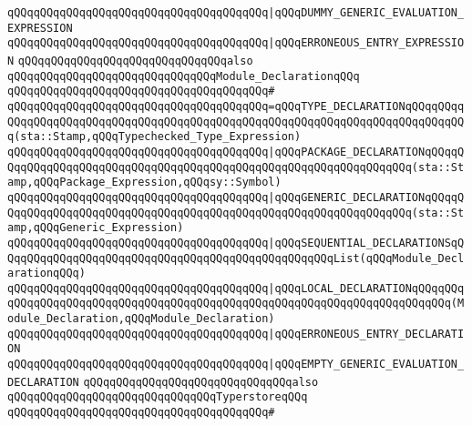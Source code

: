 \verb|qQQqqQQqqQQqqQQqqQQqqQQqqQQqqQQqqQQqqQQq|\verb#|qQQqDUMMY_GENERIC_EVALUATION_EXPRESSION#\newline
\verb|qQQqqQQqqQQqqQQqqQQqqQQqqQQqqQQqqQQqqQQq|\verb#|qQQqERRONEOUS_ENTRY_EXPRESSION#\newline
\newline
\newline
\newline
\verb|qQQqqQQqqQQqqQQqqQQqqQQqqQQqqQQqalso|\newline
\verb|qQQqqQQqqQQqqQQqqQQqqQQqqQQqqQQqModule_DeclarationqQQq|\newline
\verb|qQQqqQQqqQQqqQQqqQQqqQQqqQQqqQQqqQQqqQQq#|\newline
\verb|qQQqqQQqqQQqqQQqqQQqqQQqqQQqqQQqqQQqqQQq=qQQqTYPE_DECLARATIONqQQqqQQqqQQqqQQqqQQqqQQqqQQqqQQqqQQqqQQqqQQqqQQqqQQqqQQqqQQqqQQqqQQqqQQqqQQqqQQq(sta::Stamp,qQQqTypechecked_Type_Expression)|\newline
\verb|qQQqqQQqqQQqqQQqqQQqqQQqqQQqqQQqqQQqqQQq|\verb#|qQQqPACKAGE_DECLARATIONqQQqqQQqqQQqqQQqqQQqqQQqqQQqqQQqqQQqqQQqqQQqqQQqqQQqqQQqqQQqqQQqqQQq(sta::Stamp,qQQqPackage_Expression,qQQqsy::Symbol)#\newline
\verb|qQQqqQQqqQQqqQQqqQQqqQQqqQQqqQQqqQQqqQQq|\verb#|qQQqGENERIC_DECLARATIONqQQqqQQqqQQqqQQqqQQqqQQqqQQqqQQqqQQqqQQqqQQqqQQqqQQqqQQqqQQqqQQqqQQq(sta::Stamp,qQQqGeneric_Expression)#\newline
\verb|qQQqqQQqqQQqqQQqqQQqqQQqqQQqqQQqqQQqqQQq|\verb#|qQQqSEQUENTIAL_DECLARATIONSqQQqqQQqqQQqqQQqqQQqqQQqqQQqqQQqqQQqqQQqqQQqqQQqqQQqList(qQQqModule_DeclarationqQQq)#\newline
\verb|qQQqqQQqqQQqqQQqqQQqqQQqqQQqqQQqqQQqqQQq|\verb#|qQQqLOCAL_DECLARATIONqQQqqQQqqQQqqQQqqQQqqQQqqQQqqQQqqQQqqQQqqQQqqQQqqQQqqQQqqQQqqQQqqQQqqQQqqQQq(Module_Declaration,qQQqModule_Declaration)#\newline
\verb|qQQqqQQqqQQqqQQqqQQqqQQqqQQqqQQqqQQqqQQq|\verb#|qQQqERRONEOUS_ENTRY_DECLARATION#\newline
\verb|qQQqqQQqqQQqqQQqqQQqqQQqqQQqqQQqqQQqqQQq|\verb#|qQQqEMPTY_GENERIC_EVALUATION_DECLARATION#\newline
\newline
\newline
\newline
\verb|qQQqqQQqqQQqqQQqqQQqqQQqqQQqqQQqalso|\newline
\verb|qQQqqQQqqQQqqQQqqQQqqQQqqQQqqQQqTyperstoreqQQq|\newline
\verb|qQQqqQQqqQQqqQQqqQQqqQQqqQQqqQQqqQQqqQQq#|\newline
